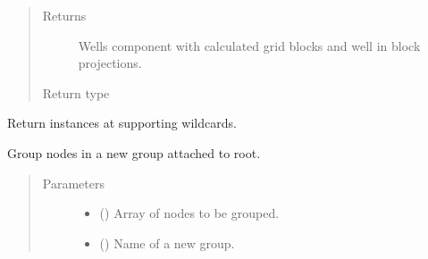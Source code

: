 \documentclass[letterpaper,10pt,english]{sphinxmanual}
\begin{document}
\begin{fulllineitems}
\begin{fulllineitems}
\begin{quote}
\begin{description}
\begin{itemize}
\end{itemize}

\item[{Returns}] \leavevmode
{} \textendash{} Wells component with calculated grid blocks and well in block projections.

\item[{Return type}] \leavevmode
{\hyperref[\detokenize{api/wells:geology.src.wells.Wells}]{}}

\end{description}\end{quote}

\end{fulllineitems}


\begin{fulllineitems}
\label{\detokenize{api/wells:geology.src.wells.Wells.glob}}
Return instances at  supporting wildcards.

\end{fulllineitems}


\begin{fulllineitems}
\label{\detokenize{api/wells:geology.src.wells.Wells.group}}
Group nodes in a new group attached to root.
\begin{quote}\begin{description}
\item[{Parameters}] \leavevmode\begin{itemize}
\item {} 
 () \textendash{} Array of nodes to be grouped.

\item {} 
 () \textendash{} Name of a new group.

\end{itemize}


\end{description}
\end{quote}
\end{fulllineitems}
\end{fulllineitems}
\end{document}

